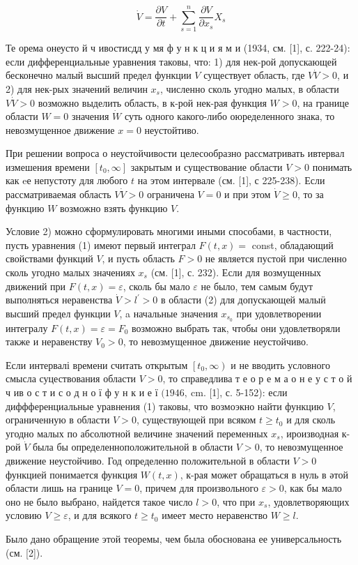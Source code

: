 \documentclass[10pt]{article}
\begin{document}
\[

\dot{V}=\frac{\partial V}{\partial t}+\sum_{s=1}^{n} \frac{\partial V}{\partial x_{s}} X_{s}

\]



Те орема онеусто й ч ивостисдд у мя ф у н к ц и я м и (1934, см. [1], с. 222-24): если дифференциальные уравнения таковы, что: 1) для нек-рой допускающей бесконечно малый высший предел функции $V$ существует область, где $V \dot{V}>0$, и 2) для нек-рых значений величин $x_{s}$, численно сколь угодно малых, в области $V \dot{V}>0$ возможно выделить область, в к-рой нек-рая функция $W>0$, на границе области $W=0$ значения $\dot{W}$ суть одного какого-либо оюределенного знака, то невозмущенное движение $x=0$ неустойтиво.



При решении вопроса о неустойчивости целесообразно рассматривать ивтервал измешения времени $\left[t_{0}, \infty\right]$ закрытым и существование области $V>0$ понимать как eе непустоту для любого $t$ на этом интервале (см. [1], с 225-238). Если рассматриваемая область $V \dot{V}>0$ ограничена $V=0$ и при этом $\dot{V} \geqslant 0$, то за функцию $W$ возможно взять функцию $V$.



Условие 2) можно сформулировать многими иными способами, в частности, пусть уравнения (1) имеют первый интеграл $F(t, x)=$ const, обладающий свойствами функций $V$, и пусть область $F>0$ не является пустой при численно сколь угодно малых значениях $x_{s}$ (см. [1], с. 232). Если для возмущенных движений при $F(t, x)=\varepsilon$, сколь бы мало $\varepsilon$ не было, тем самым будут выполняться неравенства $\dot{V}>l^{\prime}>0$ в области (2) для допускающей малыӥ высший предел функции $V$, a начальные значения $x_{s_{0}}$ при удовлетворении интегралу $F(t, x)=\varepsilon=F_{0}$ возможно выбрать так, чтобы они удовлетворяли также и неравенству $V_{0}>0$, то невозмущенное движение неустойчиво.



Если интервалі времени считать открытым $\left[t_{0}, \infty\right)$ и не вводить условного смысла суцествования области $V>0$, то справедлива т е о р е м а о н е у с т о й ч ив о с т и с о д н о ї ф у н к и е ї $(1946, \mathrm{~cm}$. [1], с. 5-152): если диффференциальные уравнения (1) таковы, что возмоэкно найти функцию $V$, ограниченную в области $V>0$, существующей при всяком $t \geqslant t_{0}$ и для сколь угодно малых по абсолютной величине значений переменных $x_{s}$, ироизводная к-рой $\dot{V}$ была бы определенноположительной в области $V>0$, то невозмущенное движение неустойчиво. Год определенно положительной в области $V>0$ функцией понимается функция $W(t, x)$, к-рая может обращаться в нуль в әтой области лишь на границе $V=0$, причем для произвольного $\varepsilon>0$, как бы мало оно не было выбрано, найдется такое число $l>0$, что при $x_{s}$, удовлетворяющих условию $V \geqslant \varepsilon$, и для всякого $t \geqslant t_{0}$ имеет место неравенство $W \geqslant l$.



Было дано обращение этой теоремы, чем была обоснована ее универсальность (см. [2]).
\end{document}
